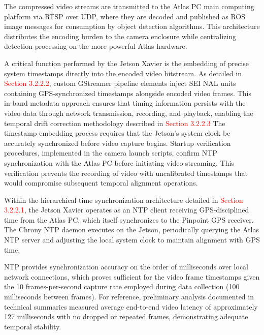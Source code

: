 \documentclass{erauthesis}
\begin{document}
The compressed video streams are transmitted to the Atlas PC main computing platform via RTSP over UDP, where they are decoded and published as ROS image messages for consumption by object detection algorithms. This architecture distributes the encoding burden to the camera enclosure while centralizing detection processing on the more powerful Atlas hardware.


A critical function performed by the Jetson Xavier is the embedding of precise system timestamps directly into the encoded video bitstream. As detailed in \textcolor{red}{Section 3.2.2.2},
custom GStreamer pipeline elements inject SEI NAL units containing GPS-synchronized timestamps alongside encoded video frames. This in-band metadata approach ensures that timing information persists with the video data through network transmission, recording, and playback, enabling the temporal drift correction methodology described in \textcolor{red}{Section 3.2.2.3}
The timestamp embedding process requires that the Jetson's system clock be accurately synchronized before video capture begins. Startup verification procedures, implemented in the camera launch scripts, confirm NTP synchronization with the Atlas PC before initiating video streaming. This verification prevents the recording of video with uncalibrated timestamps that would compromise subsequent temporal alignment operations.


Within the hierarchical time synchronization architecture detailed in \textcolor{red}{Section 3.2.2.1},
the Jetson Xavier operates as an NTP client receiving GPS-disciplined time from the Atlas PC, which itself synchronizes to the Pinpoint GPS receiver. The Chrony NTP daemon executes on the Jetson, periodically querying the Atlas NTP server and adjusting the local system clock to maintain alignment with GPS time.

NTP provides synchronization accuracy on the order of milliseconds over local network connections, which proves sufficient for the video frame timestamps given the 10 frames-per-second capture rate employed during data collection (100 milliseconds between frames). For reference, preliminary analysis documented in technical summaries measured average end-to-end video latency of approximately 127 milliseconds with no dropped or repeated frames, demonstrating adequate temporal stability.
\end{document}
